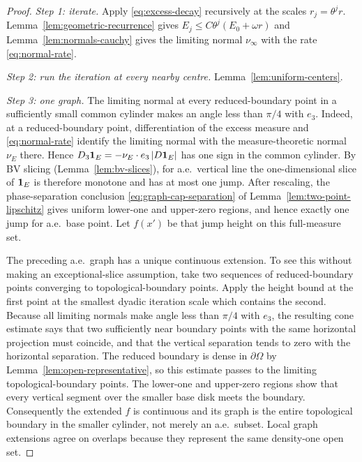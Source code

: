 \begin{proof}
\emph{Step 1: iterate.}  Apply \eqref{eq:excess-decay} recursively at the
scales $r_j=\theta^jr$.  Lemma~\ref{lem:geometric-recurrence} gives
$E_j\le C\theta^j(E_0+\omega r)$ and Lemma~\ref{lem:normals-cauchy} gives the
limiting normal $\nu_\infty$ with the rate \eqref{eq:normal-rate}.

\emph{Step 2: run the iteration at every nearby centre.}
Lemma~\ref{lem:uniform-centers}.

\emph{Step 3: one graph.}  The limiting normal at every reduced-boundary point
in a sufficiently small common cylinder makes an angle less than $\pi/4$ with
$e_3$.  Indeed, at a reduced-boundary point, differentiation of the excess
measure and \eqref{eq:normal-rate} identify the limiting normal with the
measure-theoretic normal $\nu_E$ there.  Hence
$D_3\mathbf 1_{E}=-\nu_E\cdot e_3\,|D\mathbf 1_{E}|$ has one sign in the common cylinder.
By BV slicing (Lemma~\ref{lem:bv-slices}), for a.e.\ vertical line the
one-dimensional slice of $\mathbf 1_{E}$ is therefore monotone and has at most one
jump.  After rescaling, the phase-separation conclusion
\eqref{eq:graph-cap-separation} of Lemma~\ref{lem:two-point-lipschitz} gives
uniform lower-one and upper-zero regions, and hence exactly one jump for a.e.\
base point.  Let $f(x')$ be that jump height on this full-measure set.

The preceding a.e.\ graph has a unique continuous extension.  To see this
without making an exceptional-slice assumption, take two sequences of
reduced-boundary points converging to topological-boundary points.  Apply the
height bound at the first point at the smallest dyadic iteration scale which
contains the second.  Because all limiting normals make angle less than
$\pi/4$ with $e_3$, the resulting cone estimate says that two sufficiently
near boundary points with the same horizontal projection must coincide, and
that the vertical separation tends to zero with the horizontal separation.
The reduced boundary is dense in $\partial\Omega$ by
Lemma~\ref{lem:open-representative}, so this estimate passes to the limiting
topological-boundary points.  The lower-one and upper-zero regions show that
every vertical segment over the smaller base disk meets the boundary.
Consequently the extended $f$ is continuous and its graph is the entire
topological boundary in the smaller cylinder, not merely an a.e.\ subset.
Local graph extensions agree on overlaps because they represent the same
density-one open set.


\end{proof}
